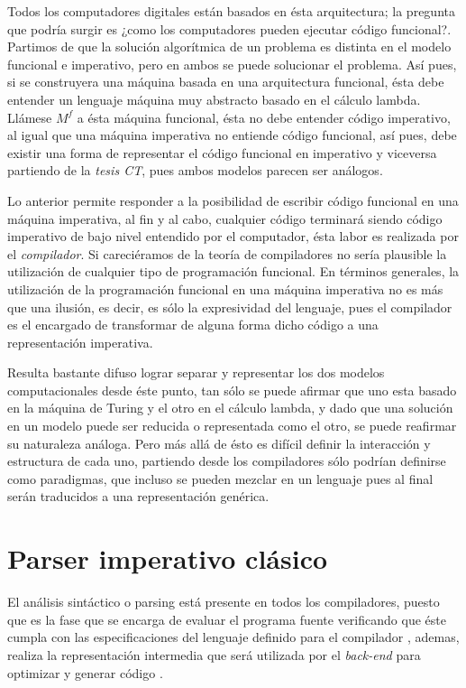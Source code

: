 	Todos los computadores digitales están basados en ésta arquitectura; la pregunta que podría surgir es ¿como los computadores pueden ejecutar código funcional?. Partimos de que la solución algorítmica de un problema es distinta en el modelo funcional e imperativo, pero en ambos se puede solucionar el problema. Así pues, si se construyera una máquina basada en una arquitectura funcional, ésta debe entender un lenguaje máquina muy abstracto basado en el cálculo lambda. Llámese $M^f$ a ésta máquina funcional, ésta no debe entender código imperativo, al igual que una máquina imperativa no entiende código funcional, así pues, debe existir una forma de representar el código funcional en imperativo y viceversa partiendo de la \emph{tesis CT}, pues ambos modelos parecen ser análogos.
	
	Lo anterior permite responder a la posibilidad de escribir código funcional en una máquina imperativa, al fin y al cabo, cualquier código terminará siendo código imperativo de bajo nivel entendido por el computador, ésta labor es realizada por el \emph{compilador}. Si careciéramos de la teoría de compiladores no sería plausible la utilización de cualquier tipo de programación funcional. En términos generales, la utilización de la programación funcional en una máquina imperativa no es más que una ilusión, es decir, es sólo la expresividad del lenguaje, pues el compilador es el encargado de transformar de alguna forma dicho código a una representación imperativa.
	
	Resulta bastante difuso lograr separar y representar los dos modelos computacionales desde éste punto, tan sólo se puede afirmar que uno esta basado en la máquina de Turing y el otro en el cálculo lambda, y dado que una solución en un modelo puede ser reducida o representada como el otro, se puede reafirmar su naturaleza análoga. Pero más allá de ésto es difícil definir la interacción y estructura de cada uno, partiendo desde los compiladores sólo podrían definirse como paradigmas, que incluso se pueden mezclar en un lenguaje pues al final serán traducidos a una representación genérica. 
	
	
\section{Parser imperativo clásico}
El análisis sintáctico o parsing está presente en todos los compiladores, puesto que es la fase que se encarga de evaluar el programa fuente verificando que éste cumpla con las especificaciones del lenguaje definido para el compilador \cite{MarioZ}, ademas, realiza la representación intermedia que será utilizada por el \emph{back-end} para optimizar y generar código \cite{Dragon}.

